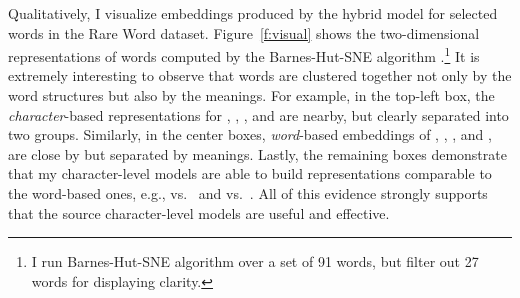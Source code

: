 Qualitatively, I visualize embeddings produced by the hybrid model \model{} for
selected words in the Rare Word dataset.
Figure~\ref{f:visual} shows the two-dimensional representations of words
computed by the
Barnes-Hut-SNE algorithm \cite{bhsne}.\footnote{I run Barnes-Hut-SNE algorithm
over a set of 91 words, but filter out 27 words for displaying clarity.} It is extremely interesting to observe that
words are clustered together not only by the word structures but also by
the meanings. For example, in the top-left box,
the {\it character}-based representations for , , , and  are nearby,
but clearly separated into two groups. Similarly, in the center boxes, {\it
word}-based embeddings of
, , , and , are
close by but separated by meanings. Lastly, the remaining boxes demonstrate that my
character-level models are able to build representations comparable to the
word-based ones, e.g.,  vs.\  and 
vs.\ . All of this evidence strongly supports that the source
character-level models are useful and effective.

